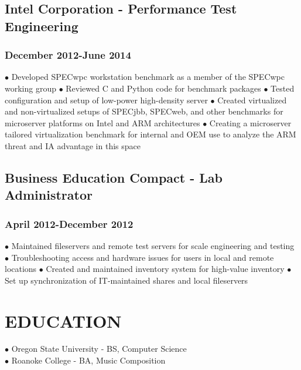 \documentclass{article}
\begin{document}
\subsection*{Intel Corporation - Performance Test Engineering}
\subsubsection*{December 2012-June 2014}

$\bullet$ Developed SPECwpc workstation benchmark as a member of the SPECwpc working group
$\bullet$ Reviewed C and Python code for benchmark packages
$\bullet$ Tested configuration and setup of low-power high-density server
$\bullet$ Created virtualized and non-virtualized setups of SPECjbb, SPECweb, and other benchmarks for microserver platforms on Intel and ARM architectures
$\bullet$ Creating a microserver tailored virtualization benchmark for internal and OEM use to analyze the ARM threat and IA advantage in this space

\subsection*{Business Education Compact - Lab Administrator}
\subsubsection*{April 2012-December 2012}

$\bullet$ Maintained fileservers and remote test servers for scale engineering and testing
$\bullet$ Troubleshooting access and hardware issues for users in local and remote locations
$\bullet$ Created and maintained inventory system for high-value inventory
$\bullet$ Set up synchronization of IT-maintained shares and local fileservers

\section*{EDUCATION}

$\bullet$ Oregon State University - BS, Computer Science\\
$\bullet$ Roanoke College - BA, Music Composition\\
\end{document}
